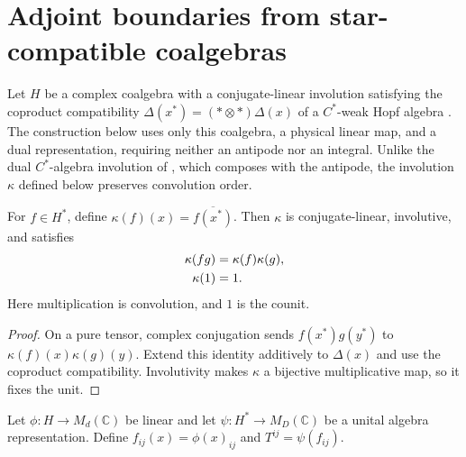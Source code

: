 \section{Adjoint boundaries from star-compatible coalgebras}
\label{sec:glm_coalgebra_adjoint}

Let $H$ be a complex coalgebra with a conjugate-linear involution satisfying
the coproduct compatibility $\Delta(x^*)=(*\otimes*)\Delta(x)$ of a
$C^*$-weak Hopf algebra \cite[Definition~5.8]{Molnar2022MPOAlgebrasI}.
The construction below uses only this coalgebra, a physical linear map, and
a dual representation, requiring neither an antipode nor an integral. Unlike
the dual $C^*$-algebra involution of
\cite[Equation~(5.38)]{Molnar2022MPOAlgebrasI}, which composes with the
antipode, the involution $\kappa$ defined below preserves convolution order.

\begin{lemma}
    \label{thm:glm_coalgebra_dual_star}
    \leanok
    For $f\in H^*$, define $\kappa(f)(x)=\overline{f(x^*)}$.
    Then $\kappa$ is conjugate-linear, involutive, and satisfies
    \begin{align}
        \kappa(fg) & =\kappa(f)\kappa(g), \notag \\
        \kappa(1)  & =1.
        \label{eq:glm_dual_star_product}
    \end{align}
    Here multiplication is convolution, and $1$ is the counit.
\end{lemma}
\begin{proof}
    \leanok
    On a pure tensor, complex conjugation sends
    $f(x^*)g(y^*)$ to $\kappa(f)(x)\kappa(g)(y)$.
    Extend this identity additively to $\Delta(x)$ and use the
    coproduct compatibility. Involutivity makes $\kappa$ a bijective
    multiplicative map, so it fixes the unit.
\end{proof}

\begin{definition}
    \label{def:glm_dual_representation_tensor}
    \leanok
    Let $\phi:H\to M_d(\mathbb C)$ be linear and let
    $\psi:H^*\to M_D(\mathbb C)$ be a unital algebra representation.
    Define $f_{ij}(x)=\phi(x)_{ij}$ and $T^{ij}=\psi(f_{ij})$.
\end{definition}

